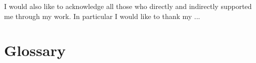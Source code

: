\documentclass[12pt] {ThesisRU}    %
\begin{document}
I would also like to acknowledge all those who directly and indirectly supported me through my work. In particular I would like to thank my ...

\newpage


\tableofcontents
\newpage

\listoffigures
\newpage

\listoftables
\newpage

\lstlistoflistings
\newpage

% 

\chapter*{Glossary}


\newpage




% 
% 




 


\begin{appendices}
% 
\end{appendices}
\end{document}
